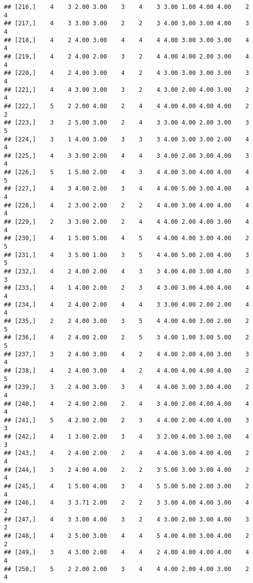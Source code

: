 \documentclass[]{article}
\begin{document}
\begin{verbatim}
## [216,]    4    3 2.00 3.00    3    4    3 3.00 1.00 4.00 4.00    2    4
## [217,]    4    3 3.00 3.00    2    2    3 4.00 3.00 3.00 4.00    3    4
## [218,]    4    2 4.00 3.00    4    4    4 4.00 3.00 3.00 3.00    4    4
## [219,]    4    2 4.00 2.00    3    2    4 4.00 4.00 2.00 3.00    4    4
## [220,]    4    2 4.00 3.00    4    2    4 3.00 3.00 3.00 3.00    3    4
## [221,]    4    4 3.00 3.00    3    2    4 3.00 2.00 4.00 3.00    2    4
## [222,]    5    2 2.00 4.00    2    4    4 4.00 4.00 4.00 4.00    2    2
## [223,]    3    2 5.00 3.00    2    4    3 3.00 4.00 2.00 3.00    3    5
## [224,]    3    1 4.00 3.00    3    3    3 4.00 3.00 3.00 2.00    4    4
## [225,]    4    3 3.00 2.00    4    4    3 4.00 2.00 3.00 4.00    3    4
## [226,]    5    1 5.00 2.00    4    3    4 4.00 3.00 4.00 4.00    4    5
## [227,]    4    3 4.00 2.00    3    4    4 4.00 5.00 3.00 4.00    4    4
## [228,]    4    2 3.00 2.00    2    2    4 4.00 3.00 4.00 4.00    4    4
## [229,]    2    3 3.00 2.00    2    4    4 4.00 2.00 4.00 3.00    4    4
## [230,]    4    1 5.00 5.00    4    5    4 4.00 4.00 3.00 4.00    2    5
## [231,]    4    3 5.00 1.00    3    5    4 4.00 5.00 2.00 4.00    3    5
## [232,]    4    2 4.00 2.00    4    3    3 4.00 4.00 3.00 4.00    3    3
## [233,]    4    1 4.00 2.00    2    3    4 3.00 3.00 4.00 4.00    4    4
## [234,]    4    2 4.00 2.00    4    4    3 3.00 4.00 2.00 2.00    4    4
## [235,]    2    2 4.00 3.00    3    5    4 4.00 4.00 3.00 2.00    2    5
## [236,]    4    2 4.00 2.00    2    5    3 4.00 1.00 3.00 5.00    2    5
## [237,]    3    2 4.00 3.00    4    2    4 4.00 2.00 4.00 3.00    3    4
## [238,]    4    2 4.00 3.00    4    2    4 4.00 4.00 4.00 4.00    2    5
## [239,]    3    2 4.00 3.00    3    4    4 4.00 3.00 3.00 4.00    2    4
## [240,]    4    2 4.00 2.00    2    4    3 4.00 2.00 4.00 4.00    4    4
## [241,]    5    4 2.00 2.00    2    3    4 4.00 2.00 4.00 4.00    3    3
## [242,]    4    1 3.00 2.00    3    4    3 2.00 4.00 3.00 3.00    4    3
## [243,]    4    2 4.00 2.00    2    4    4 4.00 3.00 4.00 4.00    2    4
## [244,]    3    2 4.00 4.00    2    2    3 5.00 3.00 3.00 4.00    2    4
## [245,]    4    1 5.00 4.00    3    4    5 5.00 5.00 2.00 3.00    2    4
## [246,]    4    3 3.71 2.00    2    2    3 3.00 4.00 4.00 3.00    4    2
## [247,]    4    3 3.00 4.00    3    2    4 3.00 2.00 3.00 4.00    3    2
## [248,]    4    2 5.00 3.00    4    4    5 4.00 4.00 3.00 4.00    2    2
## [249,]    3    4 3.00 2.00    4    4    2 4.00 4.00 4.00 4.00    4    4
## [250,]    5    2 2.00 2.00    3    4    4 4.00 2.00 4.00 3.00    2    4

\end{verbatim}
\end{document}
